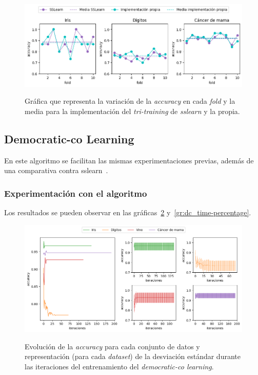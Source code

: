 \begin{figure}[h]
	\caption[\textit{Tri-training}: comparativa contra \textit{sslearn}]{Gráfica que representa la variación de la \textit{accuracy} en cada \textit{fold} y la media para la implementación del \textit{tri-training} de \textit{sslearn} y la propia.}
	\centering
	\includegraphics[scale=0.62]{../img/memoria/5_tritraining_sslearn}
	\label{gr:tt_vs_sslearn}
\end{figure}


\subsection{Democratic-co Learning}

En este algoritmo se facilitan las mismas experimentaciones previas, además de una comparativa contra sslearn~\cite{sslearnRepo}.

\subsubsection{Experimentación con el algoritmo}
Los resultados se pueden observar en las gráficas~\ref{gr:dc_train-iterations} y~\ref{gr:dc_time-percentage}.

\begin{figure}[h]
	\caption[\textit{Democratic-co}: resultados (iteraciones-entrenamiento)]{Evolución de la \textit{accuracy} para cada conjunto de datos y representación (para cada \textit{dataset}) de la desviación estándar durante las iteraciones del entrenamiento del \textit{democratic-co learning}.}
	\centering
	\includegraphics[scale=0.5]{../img/memoria/5_democraticco_score-iteraciones}
	\label{gr:dc_train-iterations}
\end{figure}

